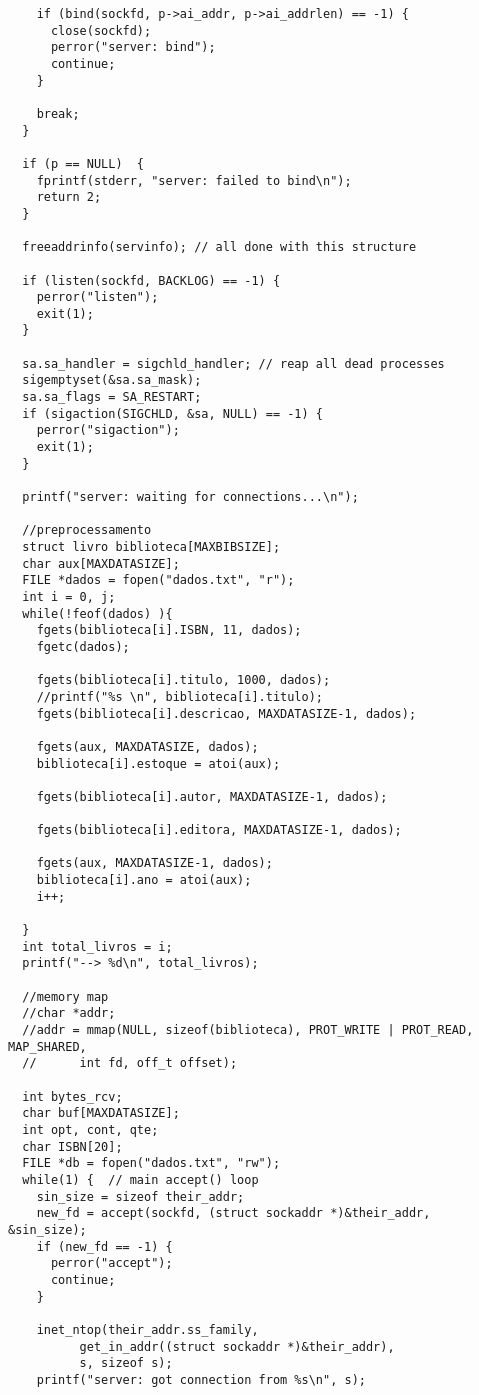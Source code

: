 \documentclass[11pt, brazil]{article} %
\begin{document}
\begin{verbatim}
    if (bind(sockfd, p->ai_addr, p->ai_addrlen) == -1) {
      close(sockfd);
      perror("server: bind");
      continue;
    }

    break;
  }

  if (p == NULL)  {
    fprintf(stderr, "server: failed to bind\n");
    return 2;
  }

  freeaddrinfo(servinfo); // all done with this structure

  if (listen(sockfd, BACKLOG) == -1) {
    perror("listen");
    exit(1);
  }

  sa.sa_handler = sigchld_handler; // reap all dead processes
  sigemptyset(&sa.sa_mask);
  sa.sa_flags = SA_RESTART;
  if (sigaction(SIGCHLD, &sa, NULL) == -1) {
    perror("sigaction");
    exit(1);
  }

  printf("server: waiting for connections...\n");

  //preprocessamento
  struct livro biblioteca[MAXBIBSIZE];
  char aux[MAXDATASIZE];
  FILE *dados = fopen("dados.txt", "r");
  int i = 0, j;
  while(!feof(dados) ){
    fgets(biblioteca[i].ISBN, 11, dados);
    fgetc(dados);
		
    fgets(biblioteca[i].titulo, 1000, dados);
    //printf("%s \n", biblioteca[i].titulo);
    fgets(biblioteca[i].descricao, MAXDATASIZE-1, dados);
		
    fgets(aux, MAXDATASIZE, dados);
    biblioteca[i].estoque = atoi(aux);
		
    fgets(biblioteca[i].autor, MAXDATASIZE-1, dados);
		
    fgets(biblioteca[i].editora, MAXDATASIZE-1, dados);
		
    fgets(aux, MAXDATASIZE-1, dados);
    biblioteca[i].ano = atoi(aux);
    i++;
		
  }
  int total_livros = i;
  printf("--> %d\n", total_livros);
	
  //memory map
  //char *addr;
  //addr = mmap(NULL, sizeof(biblioteca), PROT_WRITE | PROT_READ, MAP_SHARED,
  //      int fd, off_t offset);
	
  int bytes_rcv;
  char buf[MAXDATASIZE];
  int opt, cont, qte;
  char ISBN[20];
  FILE *db = fopen("dados.txt", "rw");
  while(1) {  // main accept() loop
    sin_size = sizeof their_addr;
    new_fd = accept(sockfd, (struct sockaddr *)&their_addr, &sin_size);
    if (new_fd == -1) {
      perror("accept");
      continue;
    }

    inet_ntop(their_addr.ss_family,
	      get_in_addr((struct sockaddr *)&their_addr),
	      s, sizeof s);
    printf("server: got connection from %s\n", s);


\end{verbatim}
\end{document}
